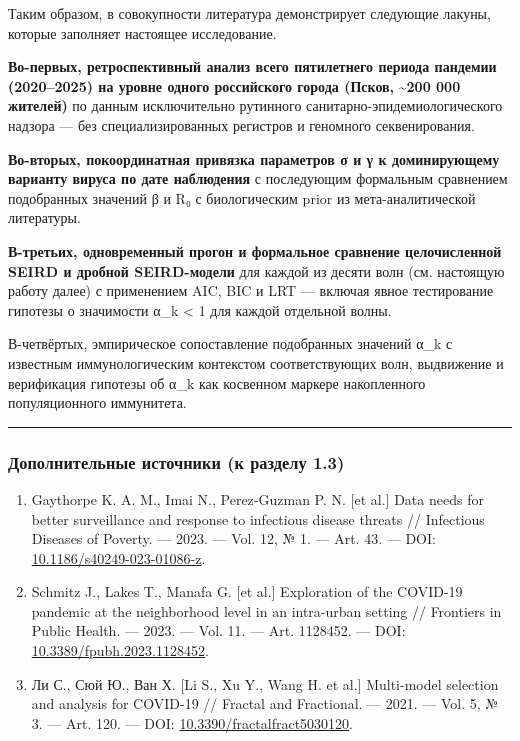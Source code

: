 \documentclass[12pt]{article}
\begin{document}
Таким образом, в совокупности литература демонстрирует следующие лакуны,
которые заполняет настоящее исследование.

\textbf{Во-первых, ретроспективный анализ всего пятилетнего периода
пандемии} \textbf{(2020--2025) на уровне одного российского города
(Псков,} \textbf{\textasciitilde200 000 жителей)} по данным
исключительно рутинного санитарно-эпидемиологического надзора --- без
специализированных регистров и геномного секвенирования.

\textbf{Во-вторых, покоординатная привязка параметров σ и γ к
доминирующему} \textbf{варианту вируса по дате наблюдения} с последующим
формальным сравнением подобранных значений β и R₀ с биологическим prior
из мета-аналитической литературы.

\textbf{В-третьих, одновременный прогон и формальное сравнение
целочисленной} \textbf{SEIRD и дробной SEIRD-модели} для каждой из
десяти волн (см. настоящую работу далее) с применением AIC, BIC и LRT
--- включая явное тестирование гипотезы о значимости α\_k \textless{} 1
для каждой отдельной волны.

В-четвёртых, эмпирическое сопоставление подобранных значений α\_k с
известным иммунологическим контекстом соответствующих волн, выдвижение и
верификация гипотезы об α\_k как косвенном маркере накопленного
популяционного иммунитета.

\begin{center}\rule{0.5\linewidth}{0.5pt}\end{center}

\subsubsection{Дополнительные источники (к разделу
1.3)}\label{ux434ux43eux43fux43eux43bux43dux438ux442ux435ux43bux44cux43dux44bux435-ux438ux441ux442ux43eux447ux43dux438ux43aux438-ux43a-ux440ux430ux437ux434ux435ux43bux443-1.3}

\begin{enumerate}
\def\labelenumi{\arabic{enumi}.}
\setcounter{enumi}{13}
\item
  Gaythorpe K. A. M., Imai N., Perez-Guzman P. N. {[}et al.{]} Data
  needs for better surveillance and response to infectious disease
  threats // Infectious Diseases of Poverty. --- 2023. --- Vol. 12, № 1.
  --- Art. 43. --- DOI:
  \href{https://doi.org/10.1186/s40249-023-01086-z}{10.1186/s40249-023-01086-z}.
\item
  Schmitz J., Lakes T., Manafa G. {[}et al.{]} Exploration of the
  COVID-19 pandemic at the neighborhood level in an intra-urban setting
  // Frontiers in Public Health. --- 2023. --- Vol. 11. --- Art.
  1128452. --- DOI:
  \href{https://doi.org/10.3389/fpubh.2023.1128452}{10.3389/fpubh.2023.1128452}.
\item
  Ли С., Сюй Ю., Ван Х. {[}Li S., Xu Y., Wang H. et al.{]} Multi-model
  selection and analysis for COVID-19 // Fractal and Fractional. ---
  2021. --- Vol. 5, № 3. --- Art. 120. --- DOI:
  \href{https://doi.org/10.3390/fractalfract5030120}{10.3390/fractalfract5030120}.
\end{enumerate}
\end{document}
